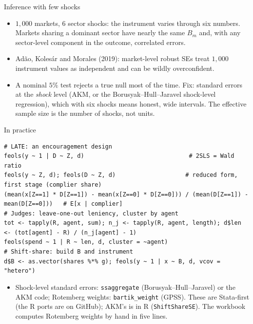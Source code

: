 \documentclass[aspectratio=169,11pt]{beamer}
\begin{document}
\begin{frame}{Inference with few shocks}
\begin{itemize}
	\item $1{,}000$ markets, $6$ sector shocks: the instrument varies through six numbers. Markets sharing a
	dominant sector have nearly the same $B_m$ and, with any sector-level component in the outcome, correlated errors.
	\item Ad\~ao, Koles\'ar and Morales (2019): market-level robust SEs treat $1{,}000$ instrument values as
	independent and can be wildly overconfident.
\end{itemize}
\begin{center}
\small

\end{center}
\begin{itemize}
	\item A nominal $5\%$ test rejects a true null most of the time. Fix: standard errors at the \emph{shock}
	level (AKM, or the Borusyak--Hull--Jaravel shock-level regression), which with six shocks means honest, wide
	intervals. The effective sample size is the number of shocks, not units.
\end{itemize}
\end{frame}


\begin{frame}[fragile]{In practice}
\begin{lstlisting}
# LATE: an encouragement design
feols(y ~ 1 | D ~ Z, d)                              # 2SLS = Wald ratio
feols(y ~ Z, d); feols(D ~ Z, d)                    # reduced form, first stage (complier share)
(mean(x[Z==1] * D[Z==1]) - mean(x[Z==0] * D[Z==0])) / (mean(D[Z==1]) - mean(D[Z==0]))   # E[x | complier]
# Judges: leave-one-out leniency, cluster by agent
tot <- tapply(R, agent, sum); n_j <- tapply(R, agent, length); d$len <- (tot[agent] - R) / (n_j[agent] - 1)
feols(spend ~ 1 | R ~ len, d, cluster = ~agent)
# Shift-share: build B and instrument
d$B <- as.vector(shares %*% g); feols(y ~ 1 | x ~ B, d, vcov = "hetero")
\end{lstlisting}
\begin{itemize}
	\item Shock-level standard errors: \texttt{ssaggregate} (Borusyak--Hull--Jaravel) or the AKM code; Rotemberg
	weights: \texttt{bartik\_weight} (GPSS). These are Stata-first (the R ports are on GitHub); AKM's is in R (\texttt{ShiftShareSE}). The workbook computes
	Rotemberg weights by hand in five lines.
\end{itemize}
\end{frame}
\end{document}
